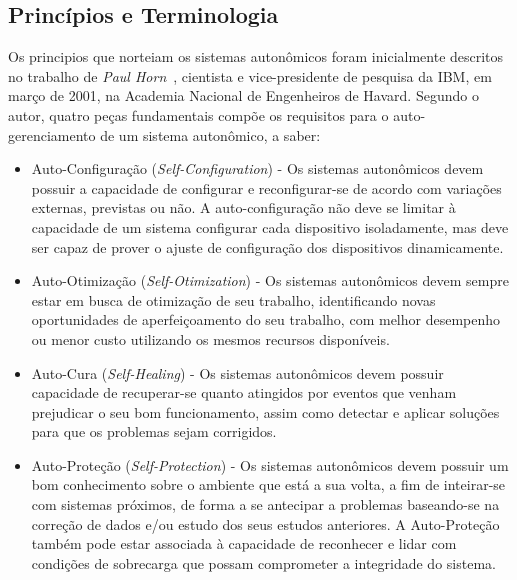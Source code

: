 \documentclass[11pt,twoside]{article}
\begin{document}
\subsection{Princípios e Terminologia}
Os principios que norteiam os sistemas autonômicos foram inicialmente descritos no trabalho de \textit{Paul Horn}~\cite{KEPHART}, cientista e vice-presidente de pesquisa da IBM, em março de 2001, na Academia Nacional de Engenheiros de Havard. Segundo o autor, quatro peças fundamentais compõe os requisitos para o auto-gerenciamento de um sistema autonômico, a saber:

\begin{itemize}
\item Auto-Configuração (\textit{Self-Configuration}) - Os sistemas autonômicos devem possuir a capacidade de configurar e reconfigurar-se de acordo com variações externas, previstas ou não. A auto-configuração não deve se limitar à capacidade de um sistema configurar cada dispositivo isoladamente, mas deve ser capaz de prover o ajuste de configuração dos dispositivos dinamicamente.

\item Auto-Otimização (\textit{Self-Otimization}) - Os sistemas autonômicos devem sempre estar em busca de otimização de seu trabalho, identificando novas oportunidades de aperfeiçoamento do seu trabalho, com melhor desempenho ou menor custo utilizando os mesmos recursos disponíveis.

\item Auto-Cura (\textit{Self-Healing}) - Os sistemas autonômicos devem possuir capacidade de recuperar-se quanto atingidos por eventos que venham prejudicar o seu bom funcionamento, assim como detectar e aplicar soluções para que os problemas sejam corrigidos. 

\item Auto-Proteção (\textit{Self-Protection}) - Os sistemas autonômicos devem possuir um bom conhecimento sobre o ambiente que está a sua volta, a fim de inteirar-se com sistemas próximos, de forma a se antecipar a problemas baseando-se na correção de dados e/ou estudo dos seus estudos anteriores. A Auto-Proteção também pode estar associada à capacidade de reconhecer e lidar com condições de sobrecarga que possam comprometer a integridade do sistema.

\end{itemize}
\end{document}
